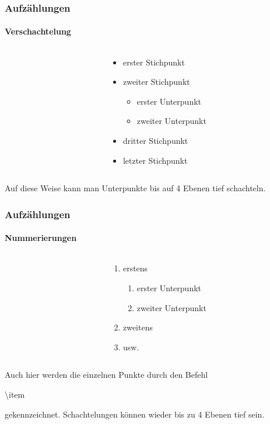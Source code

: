 \begin{frame}
\frametitle{Aufzählungen}
\framesubtitle{Verschachtelung}

\begin{columns}
\begin{column}{.5\textwidth}
\begin{ttfamily}%

\end{ttfamily}
\end{column}
\begin{column}{.5\textwidth}
\begin{itemize}
\item erster Stichpunkt
\item zweiter Stichpunkt
\begin{itemize}
\item erster Unterpunkt
\item zweiter Unterpunkt
\end{itemize}
\item dritter Stichpunkt
\item letzter Stichpunkt
\end{itemize}
\end{column}
\end{columns}
\bigskip
Auf diese Weise kann man Unterpunkte bis auf 4 Ebenen tief schachteln.
\end{frame}


\begin{frame}
\frametitle{Aufzählungen}
\framesubtitle{Nummerierungen}

\begin{columns}
\begin{column}{.5\textwidth}
\begin{ttfamily}%

\end{ttfamily}
\end{column}
\begin{column}{.5\textwidth}
\begin{enumerate}
\item erstens
\begin{enumerate}
\item erster Unterpunkt
\item zweiter Unterpunkt
\end{enumerate}
\item zweitens
\item usw.
\end{enumerate}
\end{column}
\end{columns}
\bigskip
Auch hier werden die einzelnen Punkte durch den Befehl \begin{ttfamily}\color{nounibaredI}\textbackslash item\color{black}\end{ttfamily} gekennzeichnet. 
Schachtelungen können wieder bis zu 4 Ebenen tief sein.
\end{frame}

